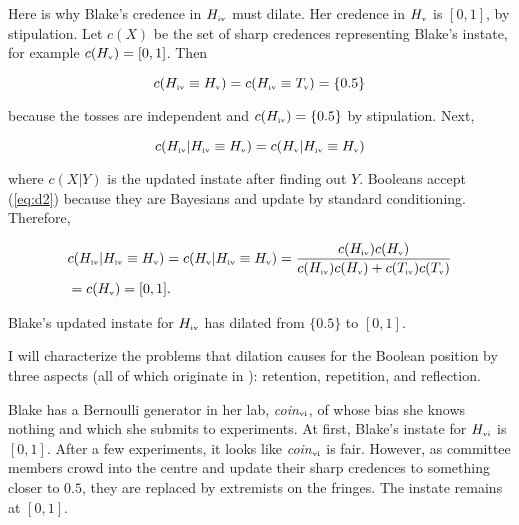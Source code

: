 \documentclass[11pt]{article}
\begin{document}
Here is why Blake's credence in $H_{\mbox{\tiny{iv}}}$ must dilate. Her
credence in $H_{\mbox{\tiny{v}}}$ is $[0,1]$, by stipulation. Let
$c(X)$ be the set of sharp credences representing Blake's instate, for
example $c(H_{\mbox{\tiny{v}}})=[0,1]$. Then

\begin{equation}
  \label{eq:d1}
  c(H_{\mbox{\tiny{iv}}}\equiv{}H_{\mbox{\tiny{v}}})=c(H_{\mbox{\tiny{iv}}}\equiv{}T_{\mbox{\tiny{v}}})=\{0.5\}
\end{equation}

because the tosses are independent and
$c(H_{\mbox{\tiny{iv}}})=\{0.5\}$ by stipulation. Next,

\begin{equation}
  \label{eq:d2}
  c(H_{\mbox{\tiny{iv}}}|H_{\mbox{\tiny{iv}}}\equiv{}H_{\mbox{\tiny{v}}})=c(H_{\mbox{\tiny{v}}}|H_{\mbox{\tiny{iv}}}\equiv{}H_{\mbox{\tiny{v}}})
\end{equation}

where $c(X|Y)$ is the updated instate after finding out $Y$. Booleans
accept (\ref{eq:d2}) because they are Bayesians and update by standard
conditioning. Therefore,

\begin{align}
  \label{eq:d3}
  &c(H_{\mbox{\tiny{iv}}}|H_{\mbox{\tiny{iv}}}\equiv{}H_{\mbox{\tiny{v}}})=c(H_{\mbox{\tiny{v}}}|H_{\mbox{\tiny{iv}}}\equiv{}H_{\mbox{\tiny{v}}})=\frac{c(H_{\mbox{\tiny{iv}}})c(H_{\mbox{\tiny{v}}})}{c(H_{\mbox{\tiny{iv}}})c(H_{\mbox{\tiny{v}}})+c(T_{\mbox{\tiny{iv}}})c(T_{\mbox{\tiny{v}}})} \notag \\
  &=c(H_{\mbox{\tiny{v}}})=[0,1].
\end{align}

Blake's updated instate for $H_{\mbox{\tiny{iv}}}$ has dilated from
$\{0.5\}$ to $[0,1]$.

I will characterize the problems that dilation causes for the Boolean
position by three aspects (all of which originate in
): retention, repetition, and reflection.

\begin{quotex}
  \label{ex:learning} Blake has a Bernoulli
  generator in her lab, \textit{coin}$_{\mbox{\tiny{vi}}}$, of whose
  bias she knows nothing and which she submits to experiments. At first,
  Blake's instate for $H_{\mbox{\tiny{vi}}}$ is $[0,1]$. After a few
  experiments, it looks like \textit{coin}$_{\mbox{\tiny{vi}}}$ is
  fair. However, as committee members crowd into the centre and update
  their sharp credences to something closer to $0.5$, they are
  replaced by extremists on the fringes. The instate remains at
  $[0,1]$. 
\end{quotex}
\end{document}

